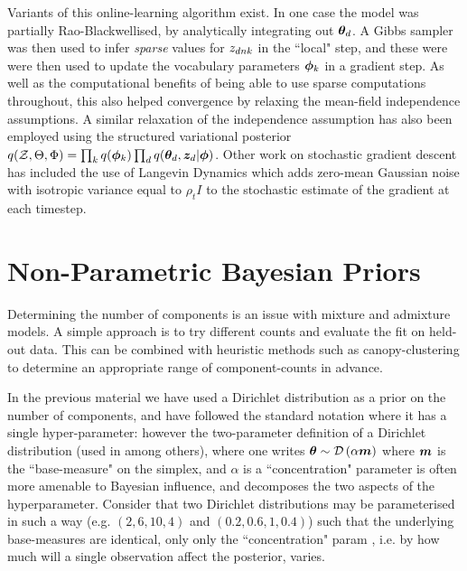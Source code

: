 Variants of this online-learning algorithm exist. In one case\cite{Mimno2012a} the model was partially Rao-Blackwellised, by analytically integrating out ${ \bm \theta_d }$. A Gibbs sampler was then used to infer \emph{sparse} values for ${ z_{dnk} }$ in the ``local" step, and these were were then used to update the vocabulary parameters ${ \bm \phi }_k$ in a gradient step. As well as the computational benefits of being able to use sparse computations throughout, this also helped convergence by relaxing the mean-field independence assumptions. A similar relaxation of the independence assumption has also been employed\cite{Hoffman2015} using the structured variational posterior \\
$q({ \mathcal{Z} }, \Theta, \Phi) = \prod_k q({ \bm \phi }_k)\prod_d q({ \bm \theta_d }, \bm z_d | { \bm \phi })$. Other work on stochastic gradient descent has included the use of Langevin Dynamics\cite{Welling2011} which adds zero-mean Gaussian noise with isotropic variance equal to $\rho_t I$ to the stochastic estimate of the gradient at each timestep.%



\section{Non-Parametric Bayesian Priors}
\label{sec:chap1:DPs}
Determining the number of components is an issue with mixture and admixture models. A simple approach is to try different counts and evaluate the fit on held-out data. This can be combined with heuristic methods such as canopy-clustering\cite{McCallum2000} to determine an appropriate range of component-counts  in advance.

In the previous material we have used a Dirichlet distribution as a prior on the number of  components, and have followed the standard notation where it has a single hyper-parameter: however the two-parameter definition of a Dirichlet distribution (used in \cite{MacKay1995}\cite{Wallach2006}\cite{Wallach2009a} among others), where one writes $\bm \theta \sim \mathcal{D} \left( {\alpha \bm m} \right)$ where $\bm m$ is the ``base-measure" on the simplex, and $\alpha$ is a ``concentration" parameter is often more amenable to Bayesian influence, and decomposes the two aspects of the hyperparameter. Consider that two Dirichlet distributions may be parameterised in such a way (e.g. $(2, 6, 10, 4)$ and $(0.2, 0.6, 1, 0.4)$) such that the underlying base-measures are identical, only only the ``concentration" param , i.e. by how much will a single observation affect the posterior, varies.

